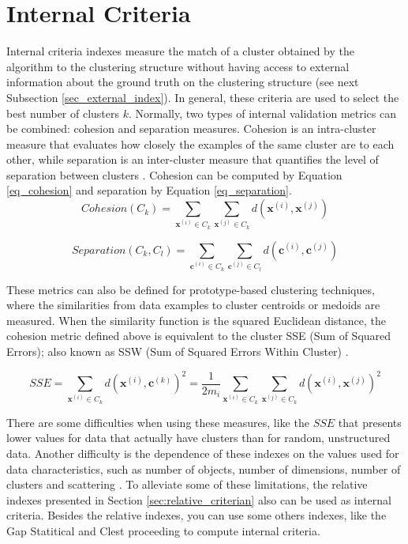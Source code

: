 \section{Internal Criteria}
\label{sec:intern_criterian}

Internal criteria indexes measure the match of a cluster obtained by the algorithm to the clustering structure without having access to external information about the ground truth on the clustering structure (see next Subsection \ref{sec_external_index}). In general, these criteria are used to select the best number of clusters $k$. Normally, two types of internal validation metrics can be combined: cohesion and separation measures. Cohesion is an intra-cluster measure that evaluates how closely the examples of the same cluster are to each other, while separation is an inter-cluster measure that quantifies the level of separation between clusters \cite{palacio2019evaluation}. Cohesion can be computed by Equation \ref{eq_cohesion} and separation by Equation \ref{eq_separation}.
\begin{equation}
\label{eq_cohesion}
    Cohesion(C_k)=\sum_{\mathbf{x}^{(i)} \in C_k} \sum_{\mathbf{x}^{(j)} \in C_k} d(\mathbf{x}^{(i)},\mathbf{x}^{(j)})
\end{equation}

\begin{equation}
\label{eq_separation}
    Separation(C_k, C_l)=\sum_{\mathbf{c}^{(i)} \in C_k} \sum_{\mathbf{c}^{(j)} \in C_l} d(\mathbf{c}^{(i)},\mathbf{c}^{(j)})
\end{equation}

These metrics can also be defined for prototype-based clustering techniques, where the similarities from data examples to cluster centroids or medoids are measured. When the similarity function is the squared Euclidean distance, the cohesion metric defined above is equivalent to the cluster SSE (Sum of Squared Errors); also known as SSW (Sum of Squared Errors Within Cluster) \cite{palacio2019evaluation}.  

\begin{equation}
\label{eq_sse}
    SSE=\sum_{\mathbf{x}^{(i)} \in C_k} d(\mathbf{x}^{(i)}, \mathbf{c}^{(k)})^2 = \frac{1}{2m_i} \sum_{\mathbf{x}^{(i)} \in C_k} \sum_{\mathbf{x}^{(j)} \in C_k} d(\mathbf{x}^{(i)},\mathbf{x}^{(j)})^2
\end{equation}

There are some difficulties when using these measures, like the $SSE$ that presents lower values for data that actually have clusters than for random, unstructured data. Another difficulty is the dependence of these indexes on the values used for data characteristics, such as number of objects, number of dimensions, number of clusters and scattering \cite{jain1988algorithms}. To alleviate some of these limitations, the relative indexes presented in Section \ref{sec:relative_criterian} also can be used as internal criteria. Besides the relative indexes, you can use some others indexes, like the Gap Statitical \cite{tibshirani2001estimating} and Clest proceeding \cite{dudoit2002prediction} to compute internal criteria. 


